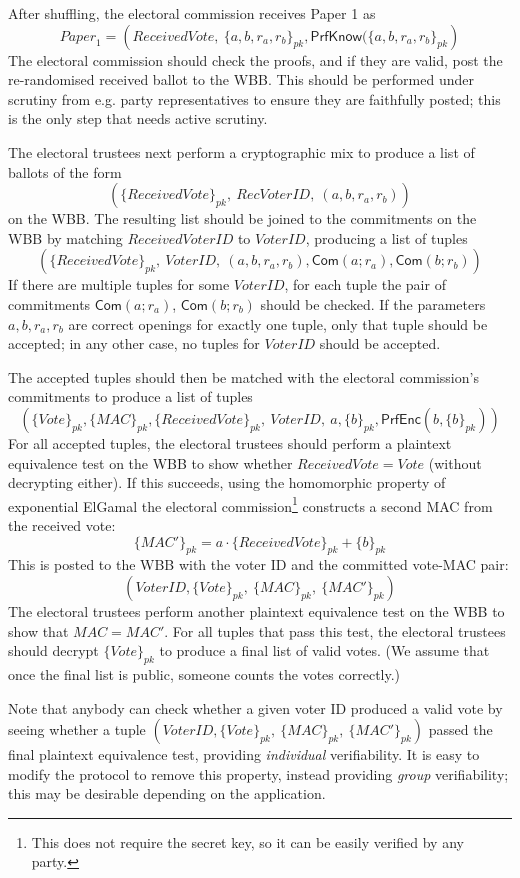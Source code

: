 \documentclass[12pt,a4paper]{article}
\newcommand{\commit}{\mathsf{Com}}
\newcommand{\PrfEnc}{\mathsf{PrfEnc}}
\newcommand{\PrfKnow}{\mathsf{PrfKnow}}
\theoremstyle{definition}
\newcommand{\Vote}{\mathit{Vote}}
\newcommand{\VoterID}{\mathit{VoterID}}
\newcommand{\receivedvid}{\mathit{RecVoterID}}
\newcommand{\Paper}{\mathit{Paper}}
\newcommand{\Mac}{\mathit{MAC}}
\begin{document}
After shuffling, the electoral commission receives Paper 1 as
$$\Paper_1=\left(ReceivedVote,\ \{a,b,r_a,r_b\}_{pk}, \PrfKnow(\{a,b,r_a,r_b\}_{pk}\right)$$
The electoral commission should check the proofs, and if they are valid, post the re-randomised received ballot to the WBB. This should be performed under scrutiny from e.g. party representatives to ensure they are faithfully posted; this is the only step that needs active scrutiny.

The electoral trustees next perform a cryptographic mix to produce a list of ballots of the form
$$\left(\{ReceivedVote\}_{pk},\ \receivedvid,\ (a,b,r_a,r_b)\right)$$
on the WBB. The resulting list should be joined to the commitments on the WBB by matching $ReceivedVoterID$ to $\VoterID$, producing a list of tuples
$$\left(\{ReceivedVote\}_{pk},\ \VoterID,\ (a,b,r_a,r_b), \commit(a;r_a), \commit(b;r_b)\right)$$
If there are multiple tuples for some $\VoterID$, for each tuple the pair of commitments $\commit(a;r_a)$, $\commit(b;r_b)$ should be checked. If the parameters $a,b,r_a,r_b$ are correct openings for exactly one tuple, only that tuple should be accepted; in any other case, no tuples for $\VoterID$ should be accepted.

The accepted tuples should then be matched with the electoral commission's commitments to produce a list of tuples
$$\left(\{\Vote\}_{pk},\{\Mac\}_{pk}, \{ReceivedVote\}_{pk},\ \VoterID,\ a, \{b\}_{pk}, \PrfEnc(b, \{b\}_{pk})\right)$$
For all accepted tuples, the electoral trustees should perform a plaintext equivalence test on the WBB to show whether $ReceivedVote=\Vote$ (without decrypting either). If this succeeds, using the homomorphic property of exponential ElGamal the electoral commission\footnote{This does not require the secret key, so it can be easily verified by any party.} constructs a second MAC from the received vote:
$$\{\Mac'\}_{pk}=a\cdot\{ReceivedVote\}_{pk}+\{b\}_{pk}$$
This is posted to the WBB with the voter ID and the committed vote-MAC pair:
$$\left(\VoterID, \{\Vote\}_{pk},\ \{\Mac\}_{pk},\ \{\Mac'\}_{pk}\right)$$
The electoral trustees perform another plaintext equivalence test on the WBB to show that $\Mac=\Mac'$. For all tuples that pass this test, the electoral trustees should decrypt $\{\Vote\}_{pk}$ to produce a final list of valid votes. (We assume that once the final list is public, someone counts the votes correctly.)

Note that anybody can check whether a given voter ID produced a valid vote by seeing whether a tuple $\left(\VoterID, \{\Vote\}_{pk},\ \{\Mac\}_{pk},\ \{\Mac'\}_{pk}\right)$ passed the final plaintext equivalence test, providing \textit{individual} verifiability. It is easy to modify the protocol to remove this property, instead providing \textit{group} verifiability; this may be desirable depending on the application.
\end{document}
